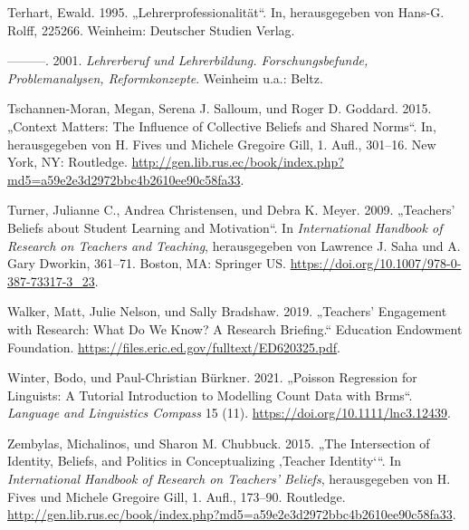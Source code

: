 \documentclass[
  letterpaper,
  DIV=11]{scrartcl}
\newlength{\cslhangindent}
\newenvironment{CSLReferences}[2] %
 {\begin{list}{}{%
  \setlength{\itemindent}{0pt}
  \setlength{\leftmargin}{0pt}
  \setlength{\parsep}{0pt}
  \ifodd #1
   \setlength{\leftmargin}{\cslhangindent}
   \setlength{\itemindent}{-1\cslhangindent}
  \fi
  \setlength{\itemsep}{#2\baselineskip}}}
 {\end{list}}
\begin{document}
\begin{CSLReferences}{1}{0}
Terhart, Ewald. 1995. {„Lehrerprofessionalität``}. In, herausgegeben von
Hans-G. Rolff, 225266. Weinheim: Deutscher Studien Verlag.

---------. 2001. \emph{Lehrerberuf und Lehrerbildung. Forschungsbefunde,
Problemanalysen, Reformkonzepte}. Weinheim u.a.: Beltz.

Tschannen-Moran, Megan, Serena J. Salloum, und Roger D. Goddard. 2015.
{„Context Matters: The Influence of Collective Beliefs and Shared
Norms``}. In, herausgegeben von H. Fives und Michele Gregoire Gill, 1.
Aufl., 301--16. New York, NY: Routledge.
\url{http://gen.lib.rus.ec/book/index.php?md5=a59e2e3d2972bbc4b2610ee90c58fa33}.

Turner, Julianne C., Andrea Christensen, und Debra K. Meyer. 2009.
{„Teachers' Beliefs about Student Learning and Motivation``}. In
\emph{International {Handbook} of {Research} on {Teachers} and
{Teaching}}, herausgegeben von Lawrence J. Saha und A. Gary Dworkin,
361--71. Boston, MA: Springer US.
\url{https://doi.org/10.1007/978-0-387-73317-3_23}.

Walker, Matt, Julie Nelson, und Sally Bradshaw. 2019. {„Teachers'
Engagement with Research: What Do We Know? {A} Research Briefing.``}
Education Endowment Foundation.
\url{https://files.eric.ed.gov/fulltext/ED620325.pdf}.

Winter, Bodo, und Paul-Christian Bürkner. 2021. {„Poisson Regression for
Linguists: A Tutorial Introduction to Modelling Count Data with Brms``}.
\emph{Language and Linguistics Compass} 15 (11).
\url{https://doi.org/10.1111/lnc3.12439}.

Zembylas, Michalinos, und Sharon M. Chubbuck. 2015. {„The {Intersection}
of {Identity}, {Beliefs}, and {Politics} in {Conceptualizing} {‚{Teacher
Identity}`}``}. In \emph{International Handbook of Research on Teachers'
Beliefs}, herausgegeben von H. Fives und Michele Gregoire Gill, 1.
Aufl., 173--90. Routledge.
\url{http://gen.lib.rus.ec/book/index.php?md5=a59e2e3d2972bbc4b2610ee90c58fa33}.

\end{CSLReferences}
\end{document}
